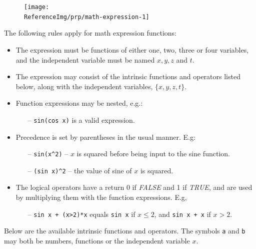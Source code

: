 \begin{figure}[H]
  \texttt{[image: \\ReferenceImg/prp/math-expression-1]}
\end{figure}

The following rules apply for  math expression functions:

\begin{itemize}
\item
  The expression must be functions of either one, two, three or four
  variables, and the independent variable must be named $x,y,z$ and $t$.
\item
  The expression may consist of the intrinsic functions and operators listed
  below, along with the independent variables, $\{x,y,z,t\}$.
\item
  Function expressions may be nested, e.g.:
  \begin{itemize}
  \item[--]
    {\tt sin(cos x)} is a valid expression.
  \end{itemize}
\item
  Precedence is set by parentheses in the usual manner. E.g:
  \begin{itemize}
  \item[--]
    {\tt sin(x\^{}2)} -- $x$ is squared before being input to the sine function.
  \item[--]
    {\tt(sin x)\^{}2} -- the value of sine of $x$ is squared.
  \end{itemize}
\item
  The logical operators have a return 0 if {\sl FALSE} and 1 if {\sl TRUE},
  and are used by multiplying them with the function expressions. E.g,
  \begin{itemize}
  \item[--]
    {\tt sin x + (x\textgreater2)*x} equals {\tt sin x} if $x\le2$,
    and {\tt sin x + x} if $x>2$.
  \end{itemize}
\end{itemize}

Below are the available intrinsic functions and operators.
The symbols {\tt a} and {\tt b} may both be numbers, functions or
the independent variable $x$.

